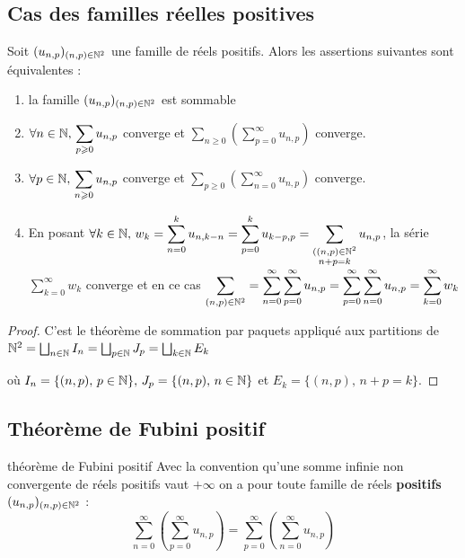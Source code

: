 \subsection{Cas des familles réelles positives}

\begin{theoreme}{}{}
    Soit $(u_{n, p})_{(n, p) \in \mathbb{N}^2}$ une famille de réels positifs.
    Alors les assertions suivantes sont équivalentes :
    \begin{enumerate}
        \item la famille $(u_{n, p})_{(n, p) \in \mathbb{N}^2}$ est sommable
        \item $\displaystyle \forall n \in \mathbb{N}, \, \sum_{p \geqslant 0 } u_{n, p}$ converge et $\displaystyle \sum_{n \geqslant 0} \left( \sum_{p = 0}^\infty u_{n, p} \right)$ converge.
        \item $\forall p \in \mathbb{N}, \, \displaystyle \sum_{n \geqslant 0 } u_{n, p}$ converge et $\displaystyle \sum_{p \geqslant 0} \left( \sum_{n = 0}^\infty u_{n, p} \right)$ converge.
        \item En posant $\forall k \in \mathbb{N}, \, w_k = \displaystyle \sum_{n = 0 }^{k }u_{n, k - n} = \sum_{p = 0 }^{k } u_{k - p, p} = \sum_{\substack{((n, p) \in \mathbb{N}^2 \\ n + p = k}} u_{n, p}$, la série $\displaystyle \sum_{k = 0}^\infty w_k$ converge
            et en ce cas $\displaystyle \sum_{(n, p) \in \mathbb{N}^2} = \sum_{n = 0 }^{\infty } \sum_{p = 0 }^{\infty }u_{n, p} = \sum_{p = 0 }^{\infty } \sum_{n = 0 }^{\infty }u_{n, p} = \sum_{k = 0 }^{\infty } w_k$ 
    \end{enumerate}
\end{theoreme}

\begin{proof}
    C'est le théorème de sommation par paquets appliqué aux partitions de
    $\mathbb{N}^2 = \bigsqcup_{n \in \mathbb{N}} I_n = \bigsqcup_{p \in \mathbb{N}} J_p = \bigsqcup_{k \in \mathbb{N}} E_k$

    où $I_n = \{ (n, p), \, p \in \mathbb{N} \}, \, J_p = \{ (n, p), \, n \in \mathbb{N} \}$ et
    $E_k = \{ (n, p), \, n + p = k \}$.
\end{proof}

\subsection{Théorème de Fubini positif }

\begin{theoreme}{théorème de Fubini positif}{}
    Avec la convention qu'une somme infinie non convergente de réels positifs vaut 
    $+ \infty$ on a pour toute famille de réels \textbf{positifs} $(u_{n, p})_{(n, p) \in \mathbb{N}^2}$ :
    $$\sum_{n = 0}^\infty \left( \sum_{p = 0}^\infty u_{n, p} \right) = \sum_{p = 0}^\infty \left( \sum_{n = 0}^\infty u_{n, p} \right) $$
\end{theoreme}

